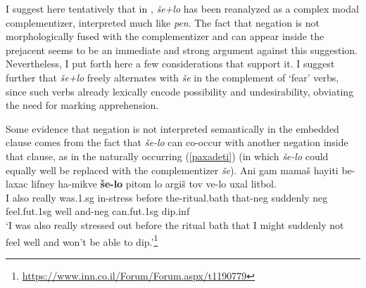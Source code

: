 \documentclass[output=paper,colorlinks,citecolor=brown]{langscibook}
\begin{document}
I suggest here tentatively that in , \textit{še+lo} has been reanalyzed as a complex modal complementizer, interpreted much like \textit{pen}. The fact that negation is not morphologically fused with the complementizer and can appear inside the prejacent seems to be an immediate and strong argument against this suggestion. Nevertheless, I put forth here a few considerations that support it. I suggest further that \textit{še+lo} freely alternates with \textit{še} in the complement of `fear' verbs, since such verbs already lexically encode possibility and undesirability, obviating the need for marking apprehension.

Some evidence that negation is not interpreted semantically in the embedded clause comes from the fact that 
\textit{še-lo} can co-occur with another negation inside that clause, as in the naturally occurring (\ref{paxadeti}) (in which \textit{še-lo} could equally well be replaced with the complementizer \textit{še}).
\ea
\label{paxadeti}
\gll Ani gam mamaš hayiti be-laxac lifney ha-mikve \textbf{še-lo} pitom lo argiš tov ve-lo uxal litbol. \\
I also  really was.{\sc 1.sg} in-stress before the-{ritual.bath} that-{\sc neg} suddenly {\sc neg} feel.{\sc fut.1sg} well and-{\sc neg} can.{\sc fut.1sg} dip.{\sc inf} \\
\glt `I was also really stressed out before the ritual bath that I might suddenly not feel well and won't be able to dip.'\footnote{\url{https://www.inn.co.il/Forum/Forum.aspx/t1190779}}
\z
\end{document}
